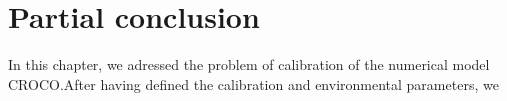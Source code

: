 \documentclass[../../Main_ManuscritThese.tex]{subfiles}
\newcommand\imgpath{/home/victor/acadwriting/Manuscrit/Text/Chapter5/img/}
\begin{document}
\section{Partial conclusion}
In this chapter, we adressed the problem of calibration of the
numerical model CROCO.\@ After having defined the calibration and
environmental parameters, we 
%   

%   

\markchapterend


\subfileLocal{
	\pagestyle{empty}
	
	
}
\end{document}
